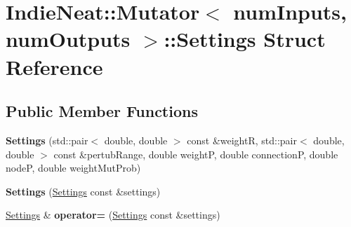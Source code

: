\hypertarget{struct_indie_neat_1_1_mutator_1_1_settings}{}\section{Indie\+Neat\+:\+:Mutator$<$ num\+Inputs, num\+Outputs $>$\+:\+:Settings Struct Reference}
\label{struct_indie_neat_1_1_mutator_1_1_settings}
\subsection*{Public Member Functions}
\begin{DoxyCompactItemize}
\item 
\mbox{\label{struct_indie_neat_1_1_mutator_1_1_settings_aaed707005142f94c0707245196d94807}} 
{\bfseries Settings} (std\+::pair$<$ double, double $>$ const \&weightR, std\+::pair$<$ double, double $>$ const \&pertub\+Range, double weightP, double connectionP, double nodeP, double weight\+Mut\+Prob)
\item 
\mbox{\label{struct_indie_neat_1_1_mutator_1_1_settings_a85e9e4c7eee813840efa5342147e623f}} 
{\bfseries Settings} (\hyperlink{struct_indie_neat_1_1_mutator_1_1_settings}{Settings} const \&settings)
\item 
\mbox{\label{struct_indie_neat_1_1_mutator_1_1_settings_abda6fa8e9a3e2b7b4721610b9d85b04d}} 
\hyperlink{struct_indie_neat_1_1_mutator_1_1_settings}{Settings} \& {\bfseries operator=} (\hyperlink{struct_indie_neat_1_1_mutator_1_1_settings}{Settings} const \&settings)
\end{DoxyCompactItemize}
